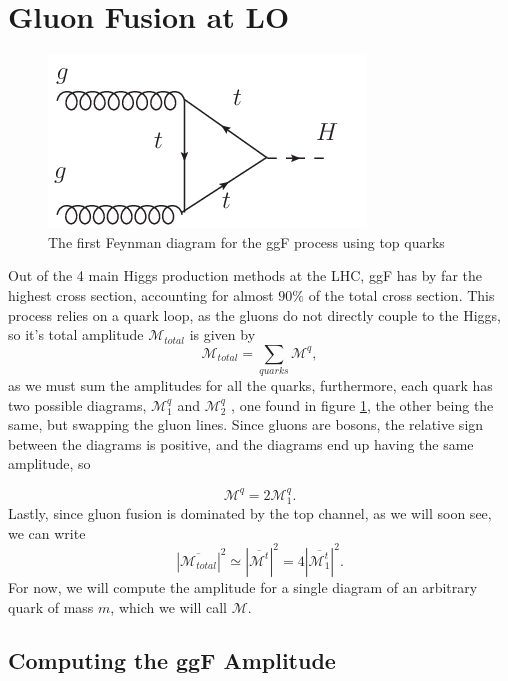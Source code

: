 \documentclass[EPJ,twocolumn]{webofc}
\begin{document}
\section{\label{sec3}Gluon Fusion at LO}

\begin{figure}[ht]
    \centering
    \includegraphics[width=.5\columnwidth]{Images/ggFDiagram.png}
    \caption{The first Feynman diagram for the ggF process using top quarks}
    \label{ggF diagram}
\end{figure}

Out of the 4 main Higgs production methods at the LHC, ggF has by far the highest cross section, accounting for almost $90\%$ of the total cross section. This process relies on a quark loop, as the gluons do not directly couple to the Higgs, so it's total amplitude $\mathcal{M}_{total}$  is given by
\begin{equation}
    \mathcal{M}_{total} =  \sum_{quarks} \mathcal{M}^q,
\end{equation}
as  we must sum the amplitudes for all the quarks, furthermore, each quark has two possible diagrams, $\mathcal{M}_1^q$ and $\mathcal{M}_2^q$ , one found in figure \ref{ggF diagram},  the other being the same, but swapping the gluon lines. Since gluons are bosons, the relative sign between the diagrams is positive, and the diagrams end up having the same amplitude, so

\begin{equation}
    \mathcal{M}^q = 2 \mathcal{M}^q_1.
\end{equation}
Lastly, since gluon fusion is dominated by the top channel, as we will soon see, we can write
\begin{equation}
    |\overline{\mathcal{M}_{total}}|^2 \simeq |\overline{\mathcal{M}^t}|^2= 4|\overline{\mathcal{M}_1^t}|^2.
\end{equation}
For now, we will compute the amplitude for a single diagram of an arbitrary quark of mass $m$, which we will call $\mathcal{M}$.


\subsection{Computing the ggF Amplitude}
\end{document}
